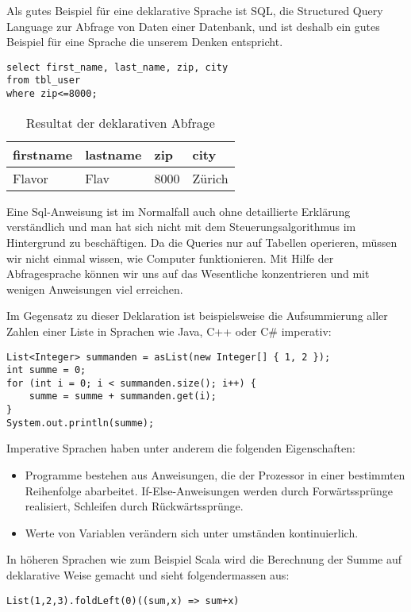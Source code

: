 Als gutes Beispiel f\"ur eine deklarative Sprache ist SQL, die Structured Query Language zur Abfrage von Daten einer Datenbank, und ist deshalb ein gutes Beispiel f\"ur eine Sprache die unserem Denken entspricht. 

\begin{lstlisting}[caption=Sql Deklaration]
select first_name, last_name, zip, city 
from tbl_user 
where zip<=8000;
\end{lstlisting}


  \begin{longtable}{|p{2cm}|p{2cm}|p{2cm}|p{2cm}|}
    \caption{Resultat der deklarativen Abfrage}\\
\hline
  firstname & lastname & zip & city\\
  \hline
    Flavor & Flav & 8000 & Z\"urich\\
  \hline
  \end{longtable}

Eine Sql-Anweisung ist im Normalfall auch ohne detaillierte Erkl\"arung verst\"andlich und man hat sich nicht mit dem Steuerungsalgorithmus im Hintergrund zu besch\"aftigen. Da die Queries nur auf Tabellen operieren, m\"ussen wir nicht einmal wissen, wie Computer funktionieren. Mit Hilfe der Abfragesprache k\"onnen wir uns auf das Wesentliche konzentrieren und mit wenigen Anweisungen viel erreichen. \cite{Piepmeyer201006}

Im Gegensatz zu dieser Deklaration ist beispielsweise die Aufsummierung aller Zahlen einer Liste in Sprachen wie Java, C++ oder C\# imperativ:

\begin{lstlisting}[caption=Summe einer Liste in Java]
List<Integer> summanden = asList(new Integer[] { 1, 2 });
int summe = 0;
for (int i = 0; i < summanden.size(); i++) {
	summe = summe + summanden.get(i);
}
System.out.println(summe);
\end{lstlisting}

Imperative Sprachen haben unter anderem die folgenden Eigenschaften:
\begin{itemize}
\item Programme bestehen aus Anweisungen, die der Prozessor in einer bestimmten Reihenfolge abarbeitet. If-Else-Anweisungen werden durch Forw\"artsspr\"unge realisiert, Schleifen durch R\"uckw\"artsspr\"unge.
\item Werte von Variablen ver\"andern sich unter umst\"anden kontinuierlich.
\end{itemize}

In h\"oheren Sprachen wie zum Beispiel Scala wird die Berechnung der Summe auf deklarative Weise gemacht und sieht folgendermassen aus:
\begin{lstlisting}[caption=Summe einer Liste in Scala]
List(1,2,3).foldLeft(0)((sum,x) => sum+x)
\end{lstlisting} 

